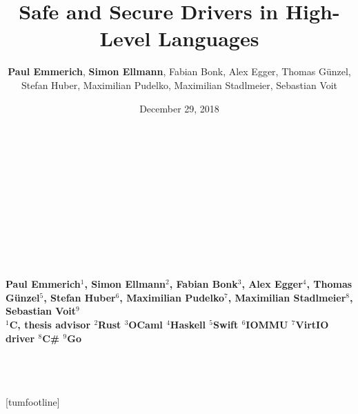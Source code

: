 \documentclass[NET,english,aspectratio=169,notitleframe]{tumbeamer}
\author[Paul Emmerich, Simon Ellmann et al.]{\textbf{Paul Emmerich}, \textbf{Simon Ellmann}, Fabian Bonk, Alex Egger, Thomas Günzel, Stefan Huber,  Maximilian Pudelko, Maximilian Stadlmeier, Sebastian Voit}
\title{Safe and Secure Drivers in High-Level Languages}
\date{December 29, 2018}
\begin{document}
  \begin{frame}[c,noframenumbering]
  \centering%
  \Large%
  \strut\textcolor{TUMBlue}{\inserttitle}%
  \\[4ex]%
  \normalsize%
  \strut\insertauthor%
  \\[2ex]%
  \footnotesize%
  \insertdate%
  \\[4ex]%
  \ifdefined\departmentname%
    \ifdefined\chairname%
      \chairname\\%
    \fi%
    \departmentname\\%
  \fi%
  \TUMname\\%
\end{frame}

  \begin{frame}[c,noframenumbering]
  \centering%
  \Large%
  \strut\textcolor{TUMBlue}{\inserttitle}%
  \\[4ex]%
  \normalsize%
  \strut{}\bfseries Paul Emmerich$^1$, Simon Ellmann$^2$, Fabian Bonk$^3$, Alex Egger$^4$, Thomas Günzel$^5$, Stefan Huber$^6$,  Maximilian Pudelko$^7$, Maximilian Stadlmeier$^8$, Sebastian Voit$^9$\normalfont %
  \\[2ex]%
  \footnotesize%
  $^1$C, thesis advisor\hspace{1em}
  $^2$Rust\hspace{1em}
  $^3$OCaml\hspace{1em}
  $^4$Haskell\hspace{1em}
  $^5$Swift\hspace{1em}
  $^6$IOMMU\hspace{1em}
  $^7$VirtIO driver\hspace{1em}
  $^8$C\#\hspace{1em}
  $^9$Go
  \\[4ex]%
    \ifdefined\departmentname%
    \ifdefined\chairname%
      \chairname\\%
    \fi%
    \departmentname\\%
  \fi%
  \TUMname\\%
\end{frame}
[tumfootline]
\end{document}

